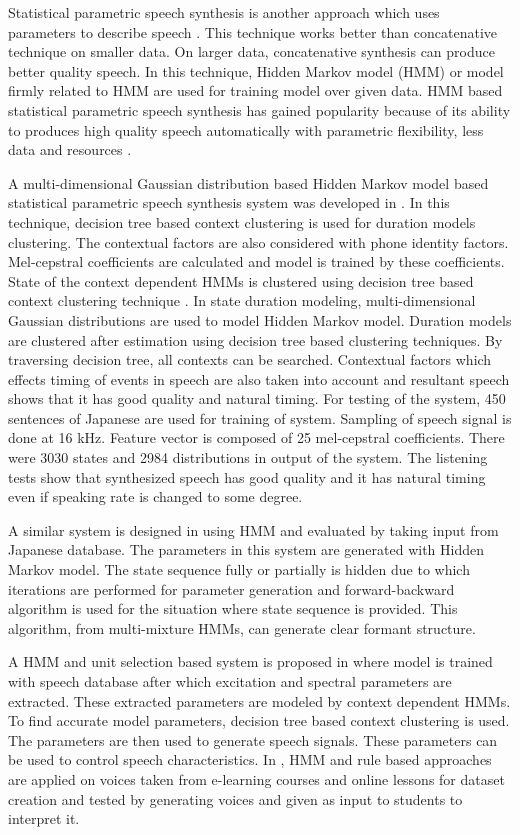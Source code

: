 Statistical parametric speech synthesis is another approach which uses parameters to describe
speech \cite{king2010beginners}. This technique works better than
concatenative technique on smaller data. On larger data, concatenative synthesis can produce better quality speech. In this technique, Hidden Markov model (HMM) or model firmly related to HMM are used for training model over given data. HMM based statistical parametric speech synthesis has gained popularity because of its ability to produces high quality speech automatically with parametric flexibility, less data and resources \cite{black2007statistical}.

A multi-dimensional Gaussian distribution based Hidden Markov model based statistical parametric speech synthesis system was developed in
\cite{yoshimura1998duration}.  In this technique, decision tree based context clustering is used for duration models clustering. The contextual factors are also considered with phone identity factors. Mel-cepstral coefficients are
calculated and model is trained by these coefficients. State of the context dependent HMMs is clustered using decision tree based
context clustering technique \cite{odellj.j1995}. In state duration modeling, multi-dimensional Gaussian distributions are
used to model Hidden Markov model. Duration models are clustered after estimation using decision tree based clustering techniques. 
By traversing decision tree, all contexts can be searched. Contextual factors which effects timing of
events in speech are also taken into account and resultant speech shows that it has good quality and natural timing. For testing
of the system, 450 sentences of Japanese are used for training of system. Sampling of speech signal is done at 16 kHz. Feature
vector is composed of 25 mel-cepstral coefficients. There were 3030 states and 2984 distributions in output of the system.
The listening tests show that synthesized speech has good quality and it has natural timing even if speaking rate is changed to
some degree.

A similar system is designed in \cite{tokuda2000speech} using HMM and evaluated by taking input
from Japanese database. The parameters in this system are generated with Hidden
Markov model. The state sequence fully or partially is hidden due to which iterations are performed for parameter generation and
forward-backward algorithm is used for the situation where state sequence is provided. This algorithm, from multi-mixture HMMs,
can generate clear formant structure.

A HMM and unit selection based system is proposed in \cite{tokuda2002hmm} where model is trained with speech database after which excitation and spectral parameters are extracted. These extracted parameters are modeled by context dependent HMMs. To find
accurate model parameters, decision tree based context clustering is used. The parameters are then used to generate speech
signals. These parameters can be used to control speech characteristics. In \cite{harashima2006review}, HMM and rule based approaches are applied 
on voices taken from e-learning courses and online lessons for dataset creation and tested by
generating voices and given as input to students to interpret it.

